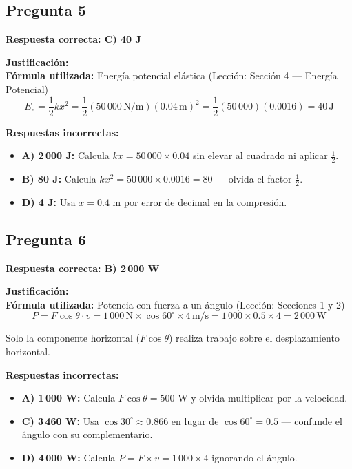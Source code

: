\begin{respuestabox}
\subsection{Pregunta 5}
\textcolor{verdecorrecto}{\textbf{Respuesta correcta: C) 40 J}}

\textbf{Justificación:}\\
\textbf{Fórmula utilizada:} Energía potencial elástica (Lección: Sección 4 --- Energía Potencial)
$$E_e = \frac{1}{2}kx^2 = \frac{1}{2}(50\,000\,\text{N/m})(0.04\,\text{m})^2 = \frac{1}{2}(50\,000)(0.0016) = 40\,\text{J}$$

\textbf{Respuestas incorrectas:}
\begin{itemize}
    \item \textbf{A) 2\,000 J:} Calcula $kx = 50\,000 \times 0.04$ sin elevar al cuadrado ni aplicar $\frac{1}{2}$.
    \item \textbf{B) 80 J:} Calcula $kx^2 = 50\,000 \times 0.0016 = 80$ --- olvida el factor $\frac{1}{2}$.
    \item \textbf{D) 4 J:} Usa $x = 0.4$ m por error de decimal en la compresión.
\end{itemize}
\end{respuestabox}

\begin{respuestabox}
\subsection{Pregunta 6}
\textcolor{verdecorrecto}{\textbf{Respuesta correcta: B) 2\,000 W}}

\textbf{Justificación:}\\
\textbf{Fórmula utilizada:} Potencia con fuerza a un ángulo (Lección: Secciones 1 y 2)
$$P = F\cos\theta \cdot v = 1\,000\,\text{N} \times \cos 60^\circ \times 4\,\text{m/s} = 1\,000 \times 0.5 \times 4 = 2\,000\,\text{W}$$

Solo la componente horizontal ($F\cos\theta$) realiza trabajo sobre el desplazamiento horizontal.

\textbf{Respuestas incorrectas:}
\begin{itemize}
    \item \textbf{A) 1\,000 W:} Calcula $F\cos\theta = 500$ W y olvida multiplicar por la velocidad.
    \item \textbf{C) 3\,460 W:} Usa $\cos 30^\circ \approx 0.866$ en lugar de $\cos 60^\circ = 0.5$ --- confunde el ángulo con su complementario.
    \item \textbf{D) 4\,000 W:} Calcula $P = F \times v = 1\,000 \times 4$ ignorando el ángulo.
\end{itemize}
\end{respuestabox}


